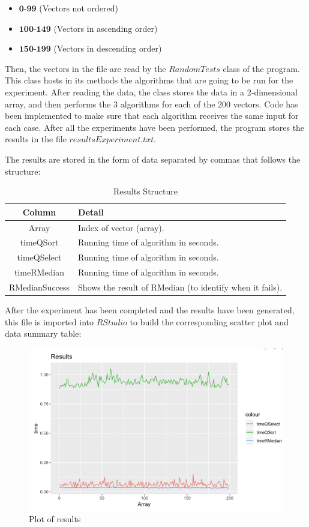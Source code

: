 \documentclass[11pt, oneside]{article}   	%
\begin{document}
\begin{itemize}
\item $\textbf{0-99}$ (Vectors not ordered)
\item $\textbf{100-149}$ (Vectors in ascending order)
\item $\textbf{150-199}$ (Vectors in descending order)
\end{itemize}

Then, the vectors in the file are read by the $RandomTests$ class of the program. This class hosts in its methods the algorithms that are going to be run for the experiment. After reading the data, the class stores the data in a 2-dimensional array, and then performs the 3 algorithms for each of the 200 vectors. Code has been implemented to make sure that each algorithm receives the same input for each case. After all the experiments have been performed, the program stores the results in the file $resultsExperiment.txt$.

The results are stored in the form of data separated by commas that follows the structure:

\begin{table}[H]
\caption{Results Structure}
 \begin{tabularx}{\columnwidth}{|c|X|}
 \hline
  Column & Detail\\
  \hline \hline
  Array & Index of vector (array).\\
  timeQSort & Running time of algorithm in seconds.\\
  timeQSelect & Running time of algorithm in seconds.\\ 
  timeRMedian & Running time of algorithm in seconds.\\ 
  RMedianSuccess & Shows the result of RMedian (to identify when it fails).\\ 
 \hline
\end{tabularx}
\label{table: results structure}
\end{table}

After the experiment has been completed and the results have been generated, this file is imported into $RStudio$ to build the corresponding scatter plot and data summary table:

\begin{figure}[H]
\centering
  \includegraphics[scale=0.45]{plotexp.png}
  \caption{Plot of results}
  \label{fig:random1}
\end{figure}
\end{document}
